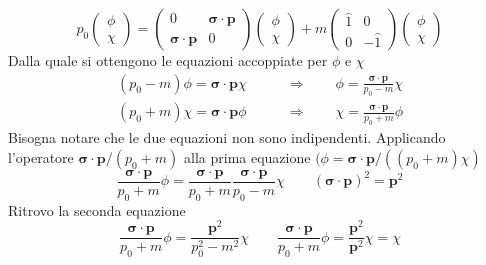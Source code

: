 \begin{equation*}
    p_0 \begin{pmatrix} \phi \\ \chi \end{pmatrix} = \begin{pmatrix} 0 & \boldsymbol{\sigma} \cdot \mathbf{p} \\ \boldsymbol{\sigma} \cdot \mathbf{p} & 0 \end{pmatrix} \begin{pmatrix} \phi \\ \chi \end{pmatrix} + m \begin{pmatrix} \hat{1} & 0 \\ 0 & -\hat{1} \end{pmatrix} \begin{pmatrix} \phi \\ \chi \end{pmatrix}
\end{equation*}
Dalla quale si ottengono le equazioni accoppiate per $\phi$ e $\chi$
\begin{align*}
    (p_0 - m)\phi = \boldsymbol{\sigma} \cdot \mathbf{p} \chi \qquad &\Longrightarrow \qquad \phi = \frac{\boldsymbol{\sigma} \cdot \mathbf{p}}{p_0 - m} \chi \\
    (p_0 + m)\chi = \boldsymbol{\sigma} \cdot \mathbf{p} \phi \qquad &\Longrightarrow \qquad \chi = \frac{\boldsymbol{\sigma} \cdot \mathbf{p}}{p_0 + m} \phi
\end{align*}
Bisogna notare che le due equazioni non sono indipendenti. Applicando l'operatore $\boldsymbol{\sigma}\cdot\mathbf{p}/(p_0+m)$ alla prima equazione $(\phi=\boldsymbol{\sigma}\cdot\mathbf{p}/((p_0+m)\chi)$
\begin{equation*}
    \frac{\boldsymbol{\sigma}\cdot\mathbf{p}}{p_0+m}\phi=\frac{\boldsymbol{\sigma}\cdot\mathbf{p}}{p_0+m}\frac{\boldsymbol{\sigma}\cdot\mathbf{p}}{p_0-m}\chi \qquad (\boldsymbol{\sigma}\cdot\mathbf{p})^2=\mathbf{p}^2
\end{equation*}
Ritrovo la seconda equazione
\begin{equation*}
    \frac{\boldsymbol{\sigma}\cdot\mathbf{p}}{p_0+m}\phi=\frac{\mathbf{p}^2}{p_0^2-m^2}\chi \qquad \frac{\boldsymbol{\sigma}\cdot\mathbf{p}}{p_0+m}\phi=\frac{\mathbf{p}^2}{\mathbf{p}^2}\chi=\chi
\end{equation*}
